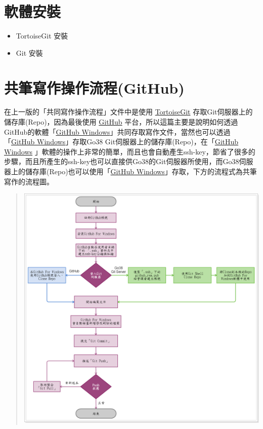 \documentclass[letterpaper,10pt,english]{sphinxmanual}
\begin{document}
\chapter{軟體安裝}
\label{_doc/software/index::doc}\label{_doc/software/index:id1}\begin{itemize}
\item {} 
TortoiseGit 安裝

\item {} 
Git 安裝

\end{itemize}


\chapter{共筆寫作操作流程(GitHub)}
\label{_doc/writing/index-github:github}\label{_doc/writing/index-github::doc}
在上一版的「共同寫作操作流程」文件中是使用 \href{https://code.google.com/p/tortoisegit/}{TortoiseGit} 存取Git伺服器上的儲存庫(Repo)，因為最後使用 \href{https://github.com/}{GitHub} 平台，所以這篇主要是說明如何透過GitHub的軟體「\href{https://windows.github.com/}{GitHub Windows}」共同存取寫作文件，當然也可以透過「\href{https://windows.github.com/}{GitHub Windows}」存取Go38 Git伺服器上的儲存庫(Repo)，在「\href{https://windows.github.com/}{GitHub Windows} 」軟體的操作上非常的簡單，而且也會自動產生ssh-key，節省了很多的步驟，而且所產生的ssh-key也可以直接供Go38的Git伺服器所使用，而Go38伺服器上的儲存庫(Repo)也可以使用「\href{https://windows.github.com/}{GitHub Windows}」存取，下方的流程式為共筆寫作的流程圖。
\begin{quote}

{\hfill\includegraphics{Flowchart.png}\hfill}
\end{quote}
\end{document}
